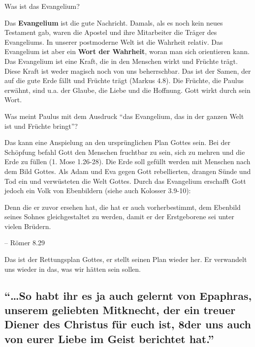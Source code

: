 \documentclass[
  12pt,
]{krantz}
\makeatletter
\newenvironment{kframe}{%
\medskip{}
\setlength{\fboxsep}{.8em}
 \def\at@end@of@kframe{}%
 \ifinner\ifhmode%
  \def\at@end@of@kframe{\end{minipage}}%
  \begin{minipage}{\columnwidth}%
 \fi\fi%
 \def\FrameCommand##1{\hskip\@totalleftmargin \hskip-\fboxsep
 \colorbox{shadecolor}{##1}\hskip-\fboxsep
     \hskip-\linewidth \hskip-\@totalleftmargin \hskip\columnwidth}%
 \MakeFramed {\advance\hsize-\width
   \@totalleftmargin\z@ \linewidth\hsize
   \@setminipage}}%
 {\par\unskip\endMakeFramed%
 \at@end@of@kframe}
\newenvironment{rmdblock}[1]
  {
  \begin{itemize}
  \renewcommand{\labelitemi}{
    \raisebox{-.7\height}[0pt][0pt]{
      {\setkeys{Gin}{width=3em,keepaspectratio}\texttt{[image: img/\#1]}}
    }
  }
  \setlength{\fboxsep}{1em}
  \begin{kframe}
  \item
  }
  {
  \end{kframe}
  \end{itemize}
  }
\newenvironment{rmdquote}
  {\begin{rmdblock}{quote}}
  {\end{rmdblock}}
\makeatother
\begin{document}
Was ist das Evangelium?

Das \textbf{Evangelium} ist die gute Nachricht. Damals, als es noch kein neues Testament gab, waren die Apostel und ihre Mitarbeiter die Träger des Evangeliums.
In unserer postmoderne Welt ist die Wahrheit relativ. Das Evangelium ist aber ein \textbf{Wort der Wahrheit}, woran man sich orientieren kann.
Das Evangelium ist eine Kraft, die in den Menschen wirkt und Früchte trägt. Diese Kraft ist weder magisch noch von uns beherrschbar. Das ist der Samen, der auf die gute Erde fällt und Früchte trägt (Markus 4.8). Die Früchte, die Paulus erwähnt, sind u.a. der Glaube, die Liebe und die Hoffnung. Gott wirkt durch sein Wort.

Was meint Paulus mit dem Ausdruck ``das Evangelium, das in der ganzen Welt ist und Früchte bringt''?

Das kann eine Anspielung an den ursprünglichen Plan Gottes sein. Bei der Schöpfung befahl Gott den Menschen fruchtbar zu sein, sich zu mehren und die Erde zu füllen (1. Mose 1.26-28). Die Erde soll gefüllt werden mit Menschen nach dem Bild Gottes. Als Adam und Eva gegen Gott rebellierten, drangen Sünde und Tod ein und verwüsteten die Welt Gottes. Durch das Evangelium erschafft Gott jedoch ein Volk von Ebenbildern (siehe auch Kolosser 3.9-10):

\begin{rmdquote}
Denn die er zuvor ersehen hat, die hat er auch vorherbestimmt, dem
Ebenbild seines Sohnes gleichgestaltet zu werden, damit er der
Erstgeborene sei unter vielen Brüdern.

-- Römer 8.29
\end{rmdquote}

Das ist der Rettungsplan Gottes, er stellt seinen Plan wieder her. Er verwandelt uns wieder in das, was wir hätten sein sollen.

\hypertarget{so-habt-ihr-es-ja-auch-gelernt-von-epaphras-unserem-geliebten-mitknecht-der-ein-treuer-diener-des-christus-fuxfcr-euch-ist-8der-uns-auch-von-eurer-liebe-im-geist-berichtet-hat.}{%
\subsection{``\ldots So habt ihr es ja auch gelernt von Epaphras, unserem geliebten Mitknecht, der ein treuer Diener des Christus für euch ist, 8der uns auch von eurer Liebe im Geist berichtet hat.''}\label{so-habt-ihr-es-ja-auch-gelernt-von-epaphras-unserem-geliebten-mitknecht-der-ein-treuer-diener-des-christus-fuxfcr-euch-ist-8der-uns-auch-von-eurer-liebe-im-geist-berichtet-hat.}}
\end{document}
